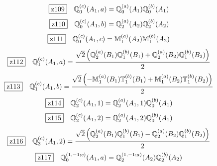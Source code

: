 \documentclass[fleqn,10pt,landscape]{jsarticle}
\begin{document}
\begin{dmath*}
\hspace*{3mm}\fbox{z109}\quad \mathbb{Q}_{0}^{(c)}(A_{1},a)=\mathbb{Q}_{0}^{(a)}(A_{1}) \mathbb{Q}_{0}^{(b)}(A_{1})
\end{dmath*}
\begin{dmath*}
\hspace*{3mm}\fbox{z110}\quad \mathbb{Q}_{0}^{(c)}(A_{1},b)=\mathbb{Q}_{2}^{(a)}(A_{2}) \mathbb{Q}_{2}^{(b)}(A_{2})
\end{dmath*}
\begin{dmath*}
\hspace*{3mm}\fbox{z111}\quad \mathbb{Q}_{0}^{(c)}(A_{1},c)=\mathbb{M}_{1}^{(a)}(A_{2}) \mathbb{M}_{1}^{(b)}(A_{2})
\end{dmath*}
\begin{dmath*}
\hspace*{3mm}\fbox{z112}\quad \mathbb{Q}_{1}^{(c)}(A_{1},a)=\frac{\sqrt{2} \left(\mathbb{Q}_{2}^{(a)}(B_{1}) \mathbb{Q}_{1}^{(b)}(B_{1}) + \mathbb{Q}_{2}^{(a)}(B_{2}) \mathbb{Q}_{1}^{(b)}(B_{2})\right)}{2}
\end{dmath*}
\begin{dmath*}
\hspace*{3mm}\fbox{z113}\quad \mathbb{Q}_{1}^{(c)}(A_{1},b)=\frac{\sqrt{2} \left(- \mathbb{M}_{1}^{(a)}(B_{1}) \mathbb{T}_{1}^{(b)}(B_{1}) + \mathbb{M}_{1}^{(a)}(B_{2}) \mathbb{T}_{1}^{(b)}(B_{2})\right)}{2}
\end{dmath*}
\begin{dmath*}
\hspace*{3mm}\fbox{z114}\quad \mathbb{Q}_{2}^{(c)}(A_{1},1)=\mathbb{Q}_{2}^{(a)}(A_{1},1) \mathbb{Q}_{0}^{(b)}(A_{1})
\end{dmath*}
\begin{dmath*}
\hspace*{3mm}\fbox{z115}\quad \mathbb{Q}_{2}^{(c)}(A_{1},2)=\mathbb{Q}_{2}^{(a)}(A_{1},2) \mathbb{Q}_{0}^{(b)}(A_{1})
\end{dmath*}
\begin{dmath*}
\hspace*{3mm}\fbox{z116}\quad \mathbb{Q}_{3}^{(c)}(A_{1},2)=\frac{\sqrt{2} \left(\mathbb{Q}_{2}^{(a)}(B_{1}) \mathbb{Q}_{1}^{(b)}(B_{1}) - \mathbb{Q}_{2}^{(a)}(B_{2}) \mathbb{Q}_{1}^{(b)}(B_{2})\right)}{2}
\end{dmath*}
\begin{dmath*}
\hspace*{3mm}\fbox{z117}\quad \mathbb{Q}_{0}^{(1,-1;c)}(A_{1},a)=\mathbb{Q}_{2}^{(1,-1;a)}(A_{2}) \mathbb{Q}_{2}^{(b)}(A_{2})
\end{dmath*}
\end{document}
